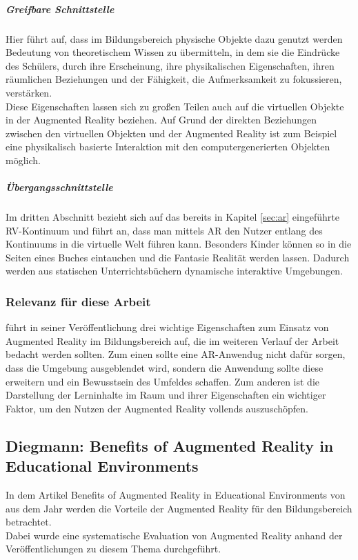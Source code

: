 \subparagraph{Greifbare Schnittstelle}
Hier führt \citeauthor{billinghurst:ar-in-education} auf, dass im Bildungsbereich physische Objekte dazu genutzt werden Bedeutung von theoretischem Wissen zu übermitteln, in dem sie die Eindrücke des Schülers, durch ihre Erscheinung, ihre physikalischen Eigenschaften, ihren räumlichen Beziehungen und der Fähigkeit, die Aufmerksamkeit zu fokussieren, verstärken.\\
Diese Eigenschaften lassen sich zu großen Teilen auch auf die virtuellen Objekte in der Augmented Reality beziehen. Auf Grund der direkten Beziehungen zwischen den virtuellen Objekten und der Augmented Reality ist zum Beispiel eine physikalisch basierte Interaktion mit den computergenerierten Objekten möglich. \citep[S. 3]{billinghurst:ar-in-education}

\subparagraph{Übergangsschnittstelle}
Im dritten Abschnitt bezieht sich \citeauthor{billinghurst:ar-in-education} auf das bereits in Kapitel \ref{sec:ar} eingeführte RV-Kontinuum und führt an, dass man mittels AR den Nutzer entlang des Kontinuums in die virtuelle Welt führen kann. Besonders Kinder können so in die Seiten eines Buches eintauchen und die Fantasie Realität werden lassen. Dadurch werden aus statischen Unterrichtsbüchern dynamische interaktive Umgebungen. \citep[S. 3-4]{billinghurst:ar-in-education}

\subsubsection{Relevanz für diese Arbeit}
\citeauthor{billinghurst:ar-in-education} führt in seiner Veröffentlichung drei wichtige Eigenschaften zum Einsatz von Augmented Reality im Bildungsbereich auf, die im weiteren Verlauf der Arbeit bedacht werden sollten. Zum einen sollte eine AR-Anwendug nicht dafür sorgen, dass die Umgebung ausgeblendet wird, sondern die Anwendung sollte diese erweitern und ein Bewusstsein des Umfeldes schaffen. Zum anderen ist die Darstellung der Lerninhalte im Raum und ihrer Eigenschaften ein wichtiger Faktor, um den Nutzen der Augmented Reality vollends auszuschöpfen. 


\subsection{Diegmann: Benefits of Augmented Reality in Educational Environments}\label{sec:diegmann-benefits-ar}
In dem Artikel \glqq  Benefits of Augmented Reality in Educational Environments\grqq{} von \citeauthor{diegmann:benefits-ar} aus dem Jahr  \citeyear{diegmann:benefits-ar} werden die Vorteile der Augmented Reality für den Bildungsbereich betrachtet. \\
Dabei wurde eine systematische Evaluation von Augmented Reality anhand der Veröffentlichungen zu diesem Thema durchgeführt. \\

